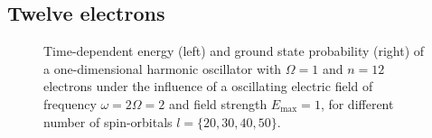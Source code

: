\vfill
\pagebreak

\subsection*{Twelve electrons}

\begin{figure}[!h]
    \centering
    \caption{Time-dependent energy (left) and ground state probability (right)
        of a one-dimensional harmonic oscillator with $\Omega=1$
        and $n=12$ electrons under the influence of a oscillating electric field 
        of frequency $\omega = 2 \Omega = 2$ and field strength $E_\text{max}=1$,
        for different number of spin-orbitals $l=\{20,30,40,50\}$.
    }
    \label{fig:1d_n12_qd}
\end{figure}

